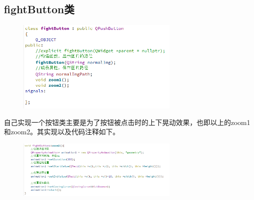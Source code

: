 \documentclass[12pt,a4paper,UTF8]{article}
\begin{document}
    \subsection{fightButton类}
    \begin{figure}[H]
      \centering
    \includegraphics[width=0.7\textwidth]{figure/button.png}
    \end{figure}
    自己实现一个按钮类主要是为了按钮被点击时的上下晃动效果，也即以上的zoom1和zoom2。其实现以及代码注释如下。
    \begin{figure}[H]
      \centering
    \includegraphics[width=0.7\textwidth]{figure/zoom.png}
    \end{figure}
  
    
\end{document}
